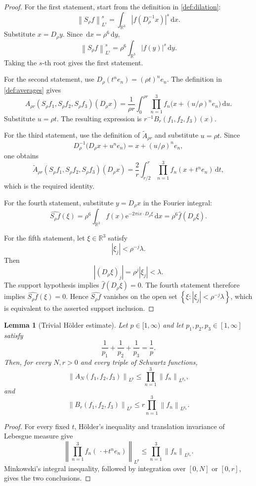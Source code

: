 \documentclass[11pt]{article}
\newtheorem{lemma}[theorem]{Lemma}
\newcommand{\R}{\mathbb{R}}
\newcommand{\e}{\mathrm{e}}
\newcommand{\dd}{\,\mathrm{d}}
\newcommand{\norm}[2]{\left\lVert #1\right\rVert_{#2}}
\newcommand{\abs}[1]{\left|#1\right|}
\newcommand{\set}[1]{\left\{#1\right\}}
\begin{document}
\begin{proof}
For the first statement, start from the definition in \cref{def:dilation}:
\[
\norm{S_\rho f}{L^s}^s
=
\int_{\R^3}\abs{f(D_\rho^{-1}x)}^s\dd x.
\]
Substitute \(x=D_\rho y\).  Since \(\dd x=\rho^6\dd y\),
\[
\norm{S_\rho f}{L^s}^s
=
\rho^6\int_{\R^3}\abs{f(y)}^s\dd y.
\]
Taking the \(s\)-th root gives the first statement.

For the second statement, use \(D_\rho(t^n e_n)=(\rho t)^n e_n\).  The definition in \cref{def:averages} gives
\[
A_{\rho r}(S_\rho f_1,S_\rho f_2,S_\rho f_3)(D_\rho x)
=
\frac1{\rho r}\int_0^{\rho r}\prod_{n=1}^{3}f_n\bigl(x+(u/\rho)^n e_n\bigr)\dd u.
\]
Substitute \(u=\rho t\).  The resulting expression is \(r^{-1}B_r(f_1,f_2,f_3)(x)\).

For the third statement, use the definition of \(\widetilde A_{\rho r}\) and substitute \(u=\rho t\).  Since
\[
D_\rho^{-1}\bigl(D_\rho x+u^n e_n\bigr)
=
x+(u/\rho)^n e_n,
\]
one obtains
\[
\widetilde A_{\rho r}(S_\rho f_1,S_\rho f_2,S_\rho f_3)(D_\rho x)
=
\frac2r\int_{r/2}^{r}\prod_{n=1}^{3}f_n(x+t^n e_n)\dd t,
\]
which is the required identity.

For the fourth statement, substitute \(y=D_\rho x\) in the Fourier integral:
\[
\widehat{S_\rho f}(\xi)
=
\rho^6\int_{\R^3}f(x)\e^{-2\pi i x\cdot D_\rho\xi}\dd x
=
\rho^6\widehat f(D_\rho\xi).
\]

For the fifth statement, let \(\xi\in\R^3\) satisfy
\[
\abs{\xi_j}<\rho^{-j}\lambda.
\]
Then
\[
\abs{(D_\rho\xi)_j}=\rho^j\abs{\xi_j}<\lambda.
\]
The support hypothesis implies \(\widehat f(D_\rho\xi)=0\).  The fourth statement therefore implies \(\widehat{S_\rho f}(\xi)=0\).  Hence \(\widehat{S_\rho f}\) vanishes on the open set \(\set{\xi:\abs{\xi_j}<\rho^{-j}\lambda}\), which is equivalent to the asserted support inclusion.
\end{proof}

\begin{lemma}[Trivial H\"older estimate]\label{lem:trivial-holder}
Let \(p\in[1,\infty)\) and let \(p_1,p_2,p_3\in[1,\infty]\) satisfy
\[
\frac1{p_1}+\frac1{p_2}+\frac1{p_3}=\frac1p.
\]
Then, for every \(N,r>0\) and every triple of Schwartz functions,
\[
\norm{A_N(f_1,f_2,f_3)}{L^p}
\leq
\prod_{n=1}^{3}\norm{f_n}{L^{p_n}},
\]
and
\[
\norm{B_r(f_1,f_2,f_3)}{L^p}
\leq
r\prod_{n=1}^{3}\norm{f_n}{L^{p_n}}.
\]
\end{lemma}

\begin{proof}
For every fixed \(t\), H\"older's inequality and translation invariance of Lebesgue measure give
\[
\norm{\prod_{n=1}^{3}f_n(\,\cdot+t^n e_n)}{L^p}
\leq
\prod_{n=1}^{3}\norm{f_n}{L^{p_n}}.
\]
Minkowski's integral inequality, followed by integration over \([0,N]\) or \([0,r]\), gives the two conclusions.
\end{proof}
\end{document}
